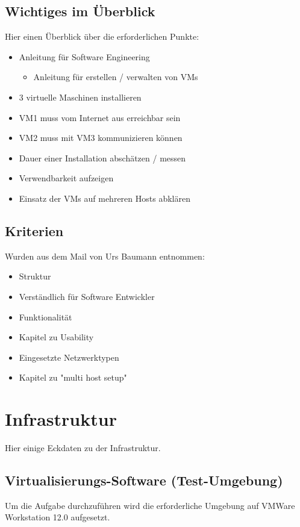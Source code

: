 \documentclass[a4,12pt]{scrartcl}
\begin{document}
\subsection{Wichtiges im Überblick}
Hier einen Überblick über die erforderlichen Punkte:
\begin{itemize}
\item Anleitung für Software Engineering 
\begin{itemize}
\item Anleitung für erstellen / verwalten von VMs
\end{itemize}
\item 3 virtuelle Maschinen installieren
\item VM1 muss vom Internet aus erreichbar sein
\item VM2 muss mit VM3 kommunizieren können
\item Dauer einer Installation abschätzen / messen
\item Verwendbarkeit aufzeigen
\item Einsatz der VMs auf mehreren Hosts abklären
\end{itemize}

\subsection{Kriterien}
Wurden aus dem Mail von Urs Baumann entnommen: 
\begin{itemize}
\item Struktur
\item Verständlich für Software Entwickler
\item Funktionalität 
\item Kapitel zu Usability 
\item Eingesetzte Netzwerktypen 
\item Kapitel zu "multi host setup"  
\end{itemize}
\newpage

\section{Infrastruktur}
Hier einige Eckdaten zu der Infrastruktur. 

\subsection{Virtualisierungs-Software (Test-Umgebung)}
Um die Aufgabe durchzuführen wird die erforderliche Umgebung auf VMWare Workstation 12.0 aufgesetzt. 
\end{document}
